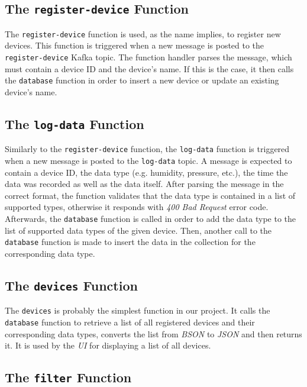 \subsection{The \texttt{register-device} Function}

The \texttt{register-device} function is used, as the name implies, to register new devices. This
function is triggered when a new message is posted to the \texttt{register-device} Kafka topic. The
function handler parses the message, which must contain a device ID and the device's name. If this
is the case, it then calls the \texttt{database} function in order to insert a new device or update
an existing device's name.

\subsection{The \texttt{log-data} Function}

Similarly to the \texttt{register-device} function, the \texttt{log-data} function is triggered when
a new message is posted to the \texttt{log-data} topic. A message is expected to contain a device
ID, the data type (e.g. humidity, pressure, etc.), the time the data was recorded as well as the
data itself. After parsing the message in the correct format, the function validates that the data
type is contained in a list of supported types, otherwise it responds with \textit{400 Bad Request}
error code. Afterwards, the \texttt{database} function is called in order to add the data type to
the list of supported data types of the given device. Then, another call to the \texttt{database}
function is made to insert the data in the collection for the corresponding data type.

\subsection{The \texttt{devices} Function}

The \texttt{devices} is probably the simplest function in our project. It calls the
\texttt{database} function to retrieve a list of all registered devices and their corresponding data
types, converts the list from \textit{BSON} to \textit{JSON} and then returns it. It is used by the
\textit{UI} for displaying a list of all devices.

\subsection{The \texttt{filter} Function}


